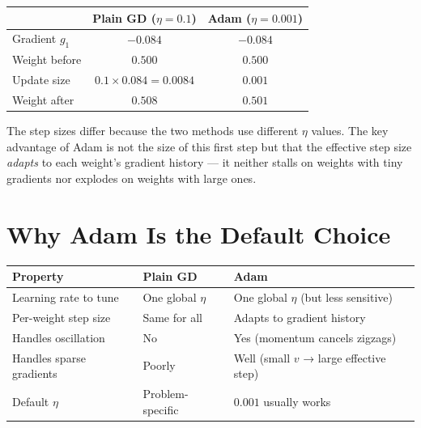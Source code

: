 \documentclass[12pt, a4paper]{article}
\theoremstyle{definition}
\begin{document}
\begin{center}
  \renewcommand{\arraystretch}{1.4}
  \begin{tabular}{lcc}
    \toprule
                   & Plain GD ($\eta = 0.1$)     & Adam ($\eta = 0.001$) \\
    \midrule
    Gradient $g_1$ & $-0.084$                    & $-0.084$              \\
    Weight before  & $0.500$                     & $0.500$               \\
    Update size    & $0.1 \times 0.084 = 0.0084$ & $0.001$               \\
    Weight after   & $0.508$                     & $0.501$               \\
    \bottomrule
  \end{tabular}
\end{center}

The step sizes differ because the two methods use different $\eta$ values.
The key advantage of Adam is not the size of this first step but that the
effective step size \emph{adapts} to each weight's gradient history ---
it neither stalls on weights with tiny gradients nor explodes on weights
with large ones.

\section{Why Adam Is the Default Choice}

\begin{center}
  \renewcommand{\arraystretch}{1.3}
  \begin{tabular}{lll}
    \toprule
    Property                 & Plain GD          & Adam                                    \\
    \midrule
    Learning rate to tune    & One global $\eta$ & One global $\eta$ (but less sensitive)  \\
    Per-weight step size     & Same for all      & Adapts to gradient history              \\
    Handles oscillation      & No                & Yes (momentum cancels zigzags)          \\
    Handles sparse gradients & Poorly            & Well (small $v$ → large effective step) \\
    Default $\eta$           & Problem-specific  & $0.001$ usually works                   \\
    \bottomrule
  \end{tabular}
\end{center}
\end{document}

